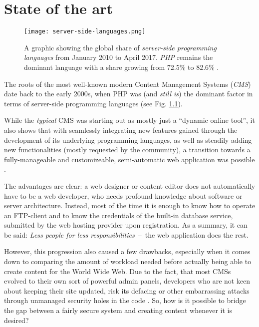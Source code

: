 \chapter{State of the art}
\label{cha:state-of-the-art}

\begin{figure}
    \centering
    \texttt{[image: server-side-languages.png]}
    \caption{A graphic showing the global share of \emph{server-side programming languages} from January 2010 to April 2017. \emph{PHP} remains the dominant language with a share growing from 72.5\% to 82.6\% \cite{W3TechLanguageTrends}.}
    \label{fig:server-side-languages}
\end{figure}
%

The roots of the most well-known modern Content Management Systems (\emph{CMS}) date back to the early 2000s, when PHP was (and \emph{still is}) the dominant factor in terms of server-side programming languages (see Fig. \ref{fig:server-side-languages}). %

While the \emph{typical} CMS was starting out as mostly just a ``dynamic online tool'', it also shows that with seamlessly integrating new features gained through the development of its underlying programming languages, as well as steadily adding new functionalities (mostly requested by the community), a transition towards a fully-manageable and customizeable, semi-automatic web application was possible \cite[17]{dhillon2016}.

The advantages are clear: a web designer or content editor does not automatically have to be a web developer, who needs profound knowledge about software or server architecture. Instead, most of the time it is enough to know how to operate an FTP-client and to know the credentials of the built-in database service, submitted by the web hosting provider upon registration. As a summary, it can be said: \emph{Less people for less responsibilities}~--~the web application does the rest.

However, this progression also caused a few drawbacks, especially when it comes down to comparing the amount of workload needed before actually being able to create content for the World Wide Web. Due to the fact, that most CMSs evolved to their own sort of powerful admin panels, developers who are not keen about keeping their site updated, risk its defacing or other embarrassing attacks through unmanaged security holes in the code \cite[23]{dhillon2016}. So, how is it possible to bridge the gap between a fairly secure system and creating content whenever it is desired?

